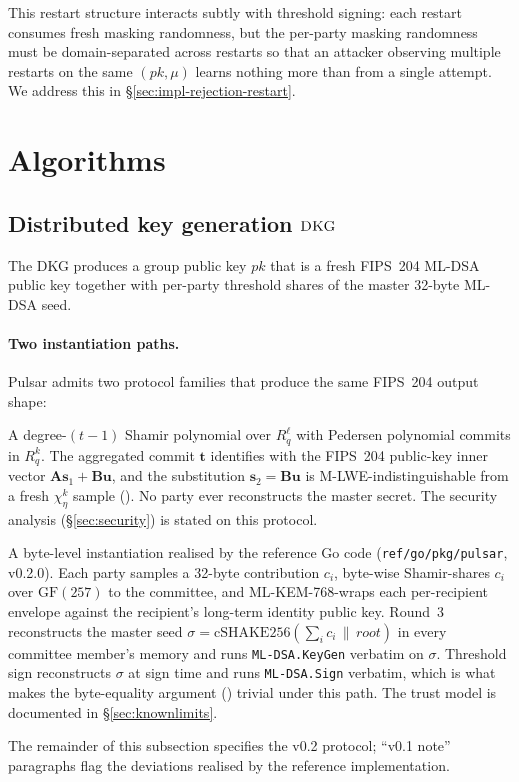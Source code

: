\documentclass[11pt,a4paper]{article}
\theoremstyle{definition}
\theoremstyle{remark}
\newcommand{\Rq}{R_q}
\newcommand{\GF}{\mathrm{GF}}
\newcommand{\cSHAKE}{\mathrm{cSHAKE256}}
\newcommand{\DKG}{\textsc{DKG}}
\begin{document}
This restart structure interacts subtly with threshold signing: each
restart consumes fresh masking randomness, but the per-party masking
randomness must be domain-separated across restarts so that an
attacker observing multiple restarts on the same $(\mathit{pk}, \mu)$
learns nothing more than from a single attempt. We address this in
\S\ref{sec:impl-rejection-restart}.

\section{Algorithms}
\label{sec:algorithms}

\subsection{Distributed key generation \texorpdfstring{$\DKG$}{DKG}}
\label{sec:dkg}

The DKG produces a group public key $\mathit{pk}$ that is a fresh
FIPS~204 ML-DSA public key together with per-party threshold shares
of the master 32-byte ML-DSA seed.

\paragraph{Two instantiation paths.}
Pulsar admits two protocol families that produce the same FIPS~204
output shape:
\begin{description}[leftmargin=*, itemsep=0pt]
\item[v0.2 target (Pedersen-VSS, this section).] A degree-$(t-1)$
Shamir polynomial over $\Rq^\ell$ with Pedersen polynomial commits
in $\Rq^k$. The aggregated commit $\mathbf{t}$ identifies with the
FIPS~204 public-key inner vector $\mathbf{A}\mathbf{s}_1 +
\mathbf{B}\mathbf{u}$, and the substitution $\mathbf{s}_2 =
\mathbf{B}\mathbf{u}$ is M-LWE-indistinguishable from a fresh
$\chi_\eta^k$ sample (). No party ever reconstructs
the master secret. The security analysis (\S\ref{sec:security}) is
stated on this protocol.
\item[v0.1 reference (Path~A reconstruction aggregator).] A
byte-level instantiation realised by the reference Go code
(\texttt{ref/go/pkg/pulsar}, v0.2.0). Each party samples a 32-byte
contribution $c_i$, byte-wise Shamir-shares $c_i$ over $\GF(257)$ to
the committee, and ML-KEM-768-wraps each per-recipient envelope
against the recipient's long-term identity public key. Round~3
reconstructs the master seed $\sigma = \cSHAKE(\sum_i c_i \,\|\,
\mathit{root})$ in every committee member's memory and runs
\texttt{ML-DSA.KeyGen} verbatim on $\sigma$. Threshold sign
reconstructs $\sigma$ at sign time and runs \texttt{ML-DSA.Sign}
verbatim, which is what makes the byte-equality argument
() trivial under this path. The trust model is
documented in \S\ref{sec:knownlimits}.
\end{description}
The remainder of this subsection specifies the v0.2 protocol;
``v0.1 note'' paragraphs flag the deviations realised by the reference
implementation.
\end{document}
